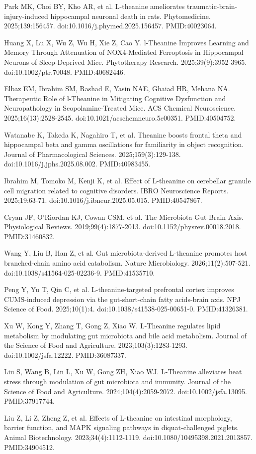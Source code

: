 \documentclass[11pt,oneside]{book}
\newcommand{\reff}[2]{\par\hangindent=7mm\hangafter=1\noindent[#1]\hspace{2mm}#2\par}
\begin{document}
\reff{11}{Park MK, Choi BY, Kho AR, et al. L-theanine ameliorates traumatic-brain-injury-induced hippocampal neuronal death in rats. Phytomedicine. 2025;139:156457. doi:10.1016/j.phymed.2025.156457. PMID:40023064.}
\reff{12}{Huang X, Lu X, Wu Z, Wu H, Xie Z, Cao Y. l-Theanine Improves Learning and Memory Through Attenuation of NOX4-Mediated Ferroptosis in Hippocampal Neurons of Sleep-Deprived Mice. Phytotherapy Research. 2025;39(9):3952-3965. doi:10.1002/ptr.70048. PMID:40682446.}
\reff{13}{Elbaz EM, Ibrahim SM, Rashad E, Yasin NAE, Ghaiad HR, Mehana NA. Therapeutic Role of l-Theanine in Mitigating Cognitive Dysfunction and Neuropathology in Scopolamine-Treated Mice. ACS Chemical Neuroscience. 2025;16(13):2528-2545. doi:10.1021/acschemneuro.5c00351. PMID:40504752.}
\reff{14}{Watanabe K, Takeda K, Nagahiro T, et al. Theanine boosts frontal theta and hippocampal beta and gamma oscillations for familiarity in object recognition. Journal of Pharmacological Sciences. 2025;159(3):129-138. doi:10.1016/j.jphs.2025.08.002. PMID:40983455.}
\reff{15}{Ibrahim M, Tomoko M, Kenji K, et al. Effect of L-theanine on cerebellar granule cell migration related to cognitive disorders. IBRO Neuroscience Reports. 2025;19:63-71. doi:10.1016/j.ibneur.2025.05.015. PMID:40547867.}
\reff{16}{Cryan JF, O'Riordan KJ, Cowan CSM, et al. The Microbiota-Gut-Brain Axis. Physiological Reviews. 2019;99(4):1877-2013. doi:10.1152/physrev.00018.2018. PMID:31460832.}
\reff{17}{Wang Y, Liu B, Han Z, et al. Gut microbiota-derived L-theanine promotes host branched-chain amino acid catabolism. Nature Microbiology. 2026;11(2):507-521. doi:10.1038/s41564-025-02236-9. PMID:41535710.}
\reff{18}{Peng Y, Yu T, Qin C, et al. L-theanine-targeted prefrontal cortex improves CUMS-induced depression via the gut-short-chain fatty acids-brain axis. NPJ Science of Food. 2025;10(1):4. doi:10.1038/s41538-025-00651-0. PMID:41326381.}
\reff{19}{Xu W, Kong Y, Zhang T, Gong Z, Xiao W. L-Theanine regulates lipid metabolism by modulating gut microbiota and bile acid metabolism. Journal of the Science of Food and Agriculture. 2023;103(3):1283-1293. doi:10.1002/jsfa.12222. PMID:36087337.}
\reff{20}{Liu S, Wang B, Lin L, Xu W, Gong ZH, Xiao WJ. L-Theanine alleviates heat stress through modulation of gut microbiota and immunity. Journal of the Science of Food and Agriculture. 2024;104(4):2059-2072. doi:10.1002/jsfa.13095. PMID:37917744.}
\reff{21}{Liu Z, Li Z, Zheng Z, et al. Effects of L-theanine on intestinal morphology, barrier function, and MAPK signaling pathways in diquat-challenged piglets. Animal Biotechnology. 2023;34(4):1112-1119. doi:10.1080/10495398.2021.2013857. PMID:34904512.}
\end{document}
